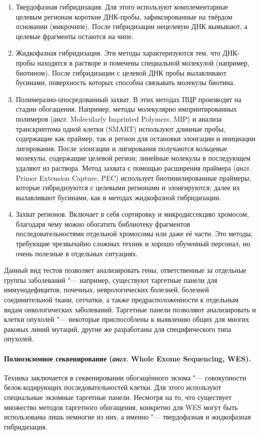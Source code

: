 \documentclass[a4paper,12pt]{article}
\begin{document}
\begin{enumerate}
\item Твердофазная гибридизация.
Для этого используют комплементарные целевым регионам короткие ДНК-пробы, зафиксированные на твёрдом основании (микрочипе).
После гибридизации нецелевую ДНК вымывают, а целевые фрагменты остаются на чипе.
\item Жидкофазная гибридизация.
Эти методы характеризуются тем, что ДНК-пробы находятся в растворе и помечены специальной молекулой (например, биотином).
После гибридизации с целевой ДНК пробы вылавливают бусинами, поверхность которых способна связывать молекулы биотина.
\item Полимеразно-опосредованный захват.
В этих методах ПЦР производят на стадии обогащения.
Например, методы молекулярно импринтированных полимеров (\textit{англ.} Molecularly Imprinted Polymers, MIP) и анализа транскриптома одной клетки (SMART) используют длинные пробы, содержащие как праймер, так и регион для остановки элонгации и инициации лигирования.
После элонгации и лигирования получаются кольцевые молекулы, содержащие целевой регион;
линейные молекулы в последующем удаляют из раствора.
Метод захвата с помощью расширения праймера (\textit{англ.} Primer Extension Capture, PEC) использует биотинилированные праймеры, которые гибридизуются с целевыми регионами и элонгируются;
далее их вылавливают бусинами, как в методах жидкофазной гибридизации.
\item Захват регионов.
Включает в себя сортировку и микродиссекцию хромосом, благодаря чему можно обогатить библиотеку фрагментов последовательностями отдельной хромосомы или даже её части.
Это методы, требующие чрезвычайно сложных техник и хорошо обученный персонал, но очень полезные в отдельных ситуациях.
\end{enumerate}

Данный вид тестов позволяет анализировать гены, ответственные за отдельные группы заболеваний "--- например, существуют таргетные панели для иммунодефицитов, почечных, неврологических болезней, болезней соединительной ткани, сетчатки, а также предрасположенности к отдельным видам онкологических заболеваний.
Таргетные панели позволяют анализировать и клетки опухолей "--- некоторые приспособлены к выявлению общих для многих раковых линий мутаций, другие же разработаны для специфического типа опухолей\cite{Yohe_2017}.

\paragraph{Полноэкзомное секвенирование (\textit{англ.} Whole Exome Sequencing, WES).}
Техника заключается в секвенировании обогащённого экзома "--- совокупности белок-кодирующих последовательностей клетки.
Для этого используют специальные экзомные таргетные панели.
Несмотря на то, что существует множество методов таргетного обогащения, конкретно для WES могут быть использованы лишь немногие из них, а именно "--- твердофазная и жидкофазная гибридизация\cite{Teer_2010}.
\end{document}
